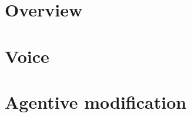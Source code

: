 \label{chap:voice}
\section{Overview}



\section{Voice}


\section{Agentive modification} \label{voice:va}

